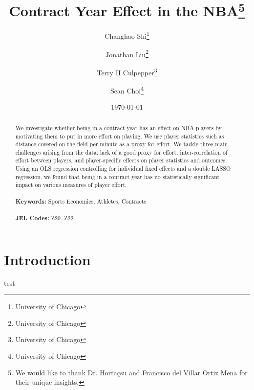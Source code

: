 \documentclass[12pt]{article}
\begin{document}
	
	\begin{titlepage}
		\title{Contract Year Effect in the NBA\thanks{We would like to thank Dr. Hortaçsu and Francisco del Villar Ortiz Mena for their unique insights.}}
		\author{Changhao Shi\thanks{University of Chicago} \and Jonathan Liu\thanks{University of Chicago} \and Terry II Culpepper\thanks{University of Chicago} \and Sean Choi\thanks{University of Chicago}}
		\date{\today}
		\maketitle
		\begin{abstract}
			\noindent We investigate whether being in a contract year has an effect on NBA players by motivating them to put in more effort on playing. We use player statistics such as distance covered on the field per minute as a proxy for effort. We tackle three main challenges arising from the data: lack of a good proxy for effort, inter-correlation of effort between players, and player-specific effects on player statistics and outcomes. Using an OLS regression controlling for individual fixed effects and a double LASSO regression, we found that being in a contract year has no statistically significant impact on various measures of player effort. \\
			\vspace{0in}\\
			\noindent\textbf{Keywords:} Sports Economics, Athletes, Contracts\\
			\vspace{0in}\\
			\noindent\textbf{JEL Codes:} Z20, Z22 \\
			
			\bigskip
		\end{abstract}
		\setcounter{page}{0}
		\thispagestyle{empty}
	\end{titlepage}
	\pagebreak \newpage
	

	
	
	\doublespacing
	
	
	\section{Introduction} \label{sec:introduction}
	test 
\end{document}
